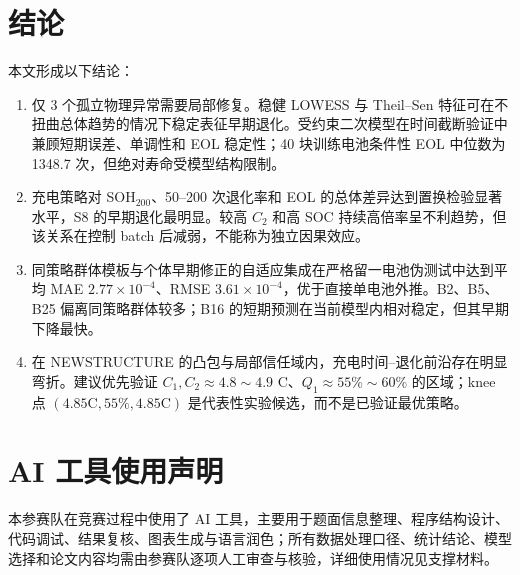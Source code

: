 \documentclass[UTF8,a4paper,zihao=-4]{ctexart}
\begin{document}
\section{结论}\label{sec:conclusion}

本文形成以下结论：
\begin{enumerate}
  \item 仅 3 个孤立物理异常需要局部修复。稳健 LOWESS 与 Theil--Sen 特征可在不扭曲总体趋势的情况下稳定表征早期退化。受约束二次模型在时间截断验证中兼顾短期误差、单调性和 EOL 稳定性；40 块训练电池条件性 EOL 中位数为 1348.7 次，但绝对寿命受模型结构限制。
  \item 充电策略对 SOH$_{200}$、50--200 次退化率和 EOL 的总体差异达到置换检验显著水平，S8 的早期退化最明显。较高 $C_2$ 和高 SOC 持续高倍率呈不利趋势，但该关系在控制 batch 后减弱，不能称为独立因果效应。
  \item 同策略群体模板与个体早期修正的自适应集成在严格留一电池伪测试中达到平均 MAE $2.77\times10^{-4}$、RMSE $3.61\times10^{-4}$，优于直接单电池外推。B2、B5、B25 偏离同策略群体较多；B16 的短期预测在当前模型内相对稳定，但其早期下降最快。
  \item 在 NEWSTRUCTURE 的凸包与局部信任域内，充电时间--退化前沿存在明显弯折。建议优先验证 $C_1,C_2\approx4.8\sim4.9$ C、$Q_1\approx55\%\sim60\%$ 的区域；knee 点 $(4.85\mathrm C,55\%,4.85\mathrm C)$ 是代表性实验候选，而不是已验证最优策略。
\end{enumerate}

\section*{AI 工具使用声明}

本参赛队在竞赛过程中使用了 AI 工具，主要用于题面信息整理、程序结构设计、代码调试、结果复核、图表生成与语言润色；所有数据处理口径、统计结论、模型选择和论文内容均需由参赛队逐项人工审查与核验，详细使用情况见支撑材料。
\end{document}
